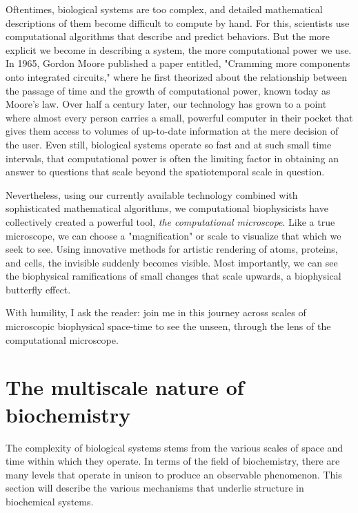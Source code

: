 \documentclass[12pt]{ucsddissertation}
\begin{document}
\begin{dissertationintroduction}
Oftentimes, biological systems are too complex, and detailed mathematical descriptions of them become difficult to compute by hand. For this, scientists use computational algorithms that describe and predict behaviors. But the more explicit we become in describing a system, the more computational power we use. In 1965, Gordon Moore published a paper entitled, "Cramming more components onto integrated circuits," \cite{Moore1965} where he first theorized about the relationship between the passage of time and the growth of computational power, known today as Moore's law. Over half a century later, our technology has grown to a point where almost every person carries a small, powerful computer in their pocket that gives them access to volumes of up-to-date information at the mere decision of the user. Even still, biological systems operate so fast and at such small time intervals, that computational power is often the limiting factor in obtaining an answer to questions that scale beyond the spatiotemporal scale in question.

Nevertheless, using our currently available technology combined with sophisticated mathematical algorithms, we computational biophysicists have collectively created a powerful tool, \textit{the computational microscope}. Like a true microscope, we can choose a "magnification" or scale to visualize that which we seek to see. Using innovative methods for artistic rendering of atoms, proteins, and cells, the invisible suddenly becomes visible. Most importantly, we can see the biophysical ramifications of small changes that scale upwards, a biophysical butterfly effect.

With humility, I ask the reader: join me in this journey across scales of microscopic biophysical space-time to see the unseen, through the lens of the computational microscope. 

\section{The multiscale nature of biochemistry}

The complexity of biological systems stems from the various scales of space and time within which they operate. In terms of the field of biochemistry, there are many levels that operate in unison to produce an observable phenomenon. This section will describe the various mechanisms that underlie structure in biochemical systems.


\end{dissertationintroduction}
\end{document}
